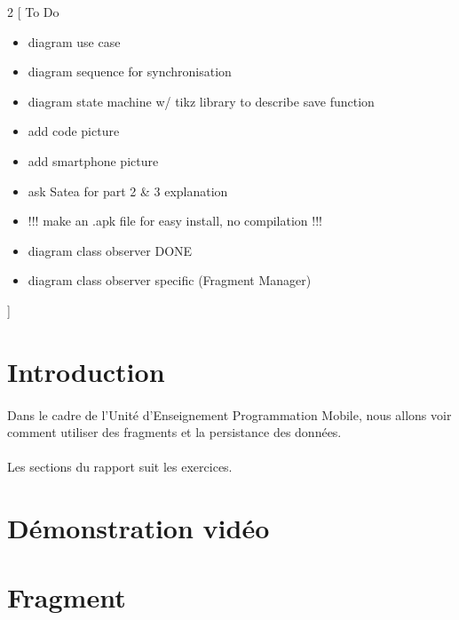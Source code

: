 \documentclass[a4paper]{article}
\begin{document}
    \newpage
    \begin{multicols}{2}
        [
            To Do
            \begin{itemize}
                \item diagram use case
                \item diagram sequence for synchronisation
                \item diagram state machine w/ tikz library to describe save function
                \item add code picture
                \item add smartphone picture
                \item ask Satea for part 2 \& 3 explanation
                \item !!! make an .apk file for easy install, no compilation !!!
                \item diagram class observer DONE
                \item diagram class observer specific (Fragment Manager)
            \end{itemize}
        ]
        \section*{Introduction}
            \paragraph{}
                Dans le cadre de l'Unité d'Enseignement Programmation Mobile, nous allons voir comment utiliser des fragments et la persistance des données.
            \paragraph{}
                Les sections du rapport suit les exercices.
        \section*{Démonstration vidéo}
        \section{Fragment}

\end{multicols}
\end{document}
